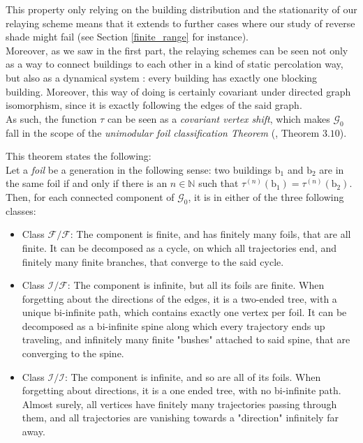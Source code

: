 \documentclass[10pt,english,a4paper]{smfart}
\theoremstyle{definition}
\theoremstyle{remark}
\newcommand{\N}{\mathbb{N}}
\newcommand{\graph}{\mathcal{G}}
\begin{document}
This property only relying on the building distribution and the stationarity of our relaying scheme means that it extends to further cases where our study of reverse shade might fail (see Section \ref{finite_range} for instance).\\
Moreover, as we saw in the first part, the  relaying schemes can be seen not only as a way to connect buildings to each other in a kind of static percolation way, but also as a dynamical system : every building has exactly one blocking building. Moreover, this way of doing is certainly covariant under directed graph isomorphism, since it is exactly following the edges of the said graph.\\
As such, the function $\tau$ can be seen as a \textit{covariant vertex shift}, which makes $\graph_0$ fall in the scope of the \textit{unimodular foil classification Theorem} (\cite{EFT}, Theorem $3.10$). 

This theorem states the following:\\
Let a \textit{foil} be a generation in the following sense: two buildings $\mathrm{b}_1$ and $\mathrm{b}_2$ are in the same foil if and only if there is an $n\in \N$ such that $\tau^{(n)}(\mathrm{b}_1) = \tau^{(n)}(\mathrm{b}_2)$. Then, for each connected component of $\graph_0$, it is in either of the three following classes:
\begin{itemize}
    \item Class $\mathcal{F}/\mathcal{F}$: The component is finite, and has finitely many foils, that are all finite. It can be decomposed as a cycle, on which all trajectories end, and finitely many finite branches, that converge to the said cycle.
    \item Class $\mathcal{I}/\mathcal{F}$: The component is infinite, but all its foils are finite. When forgetting about the directions of the edges, it is a two-ended tree, with a unique bi-infinite path, which contains exactly one vertex per foil. It can be decomposed as a bi-infinite spine along which every trajectory ends up traveling, and infinitely many finite "bushes" attached to said spine, that are converging to the spine.
    \item Class $\mathcal{I}/\mathcal{I}$: The component is infinite, and so are all of its foils. When forgetting about directions, it is a one ended tree, with no bi-infinite path. Almost surely, all vertices have finitely many trajectories passing through them, and all trajectories are vanishing towards a "direction" infinitely far away.
\end{itemize}
\end{document}
